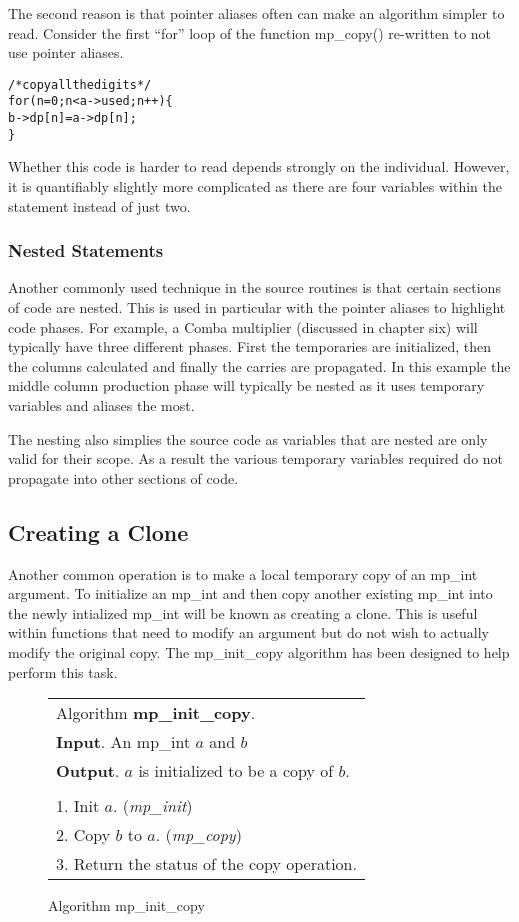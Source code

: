 \documentclass[b5paper]{book}
\begin{document}
The second reason is that pointer aliases often can make an algorithm simpler to read.  Consider the first ``for'' 
loop of the function mp\_copy() re-written to not use pointer aliases.

\begin{alltt}
    /* copy all the digits */
    for (n = 0; n < a->used; n++) \{
      b->dp[n] = a->dp[n];
    \}
\end{alltt}

Whether this code is harder to read depends strongly on the individual.  However, it is quantifiably slightly more 
complicated as there are four variables within the statement instead of just two.

\subsubsection{Nested Statements}
Another commonly used technique in the source routines is that certain sections of code are nested.  This is used in
particular with the pointer aliases to highlight code phases.  For example, a Comba multiplier (discussed in chapter six)
will typically have three different phases.  First the temporaries are initialized, then the columns calculated and 
finally the carries are propagated.  In this example the middle column production phase will typically be nested as it
uses temporary variables and aliases the most.

The nesting also simplies the source code as variables that are nested are only valid for their scope.  As a result
the various temporary variables required do not propagate into other sections of code.


\subsection{Creating a Clone}
Another common operation is to make a local temporary copy of an mp\_int argument.  To initialize an mp\_int 
and then copy another existing mp\_int into the newly intialized mp\_int will be known as creating a clone.  This is 
useful within functions that need to modify an argument but do not wish to actually modify the original copy.  The 
mp\_init\_copy algorithm has been designed to help perform this task.

\begin{figure}[here]
\begin{center}
\begin{tabular}{l}
\hline Algorithm \textbf{mp\_init\_copy}. \\
\textbf{Input}.   An mp\_int $a$ and $b$\\
\textbf{Output}.  $a$ is initialized to be a copy of $b$. \\
\hline \\
1.  Init $a$.  (\textit{mp\_init}) \\
2.  Copy $b$ to $a$.  (\textit{mp\_copy}) \\
3.  Return the status of the copy operation. \\
\hline
\end{tabular}
\end{center}
\caption{Algorithm mp\_init\_copy}
\end{figure}
\end{document}
